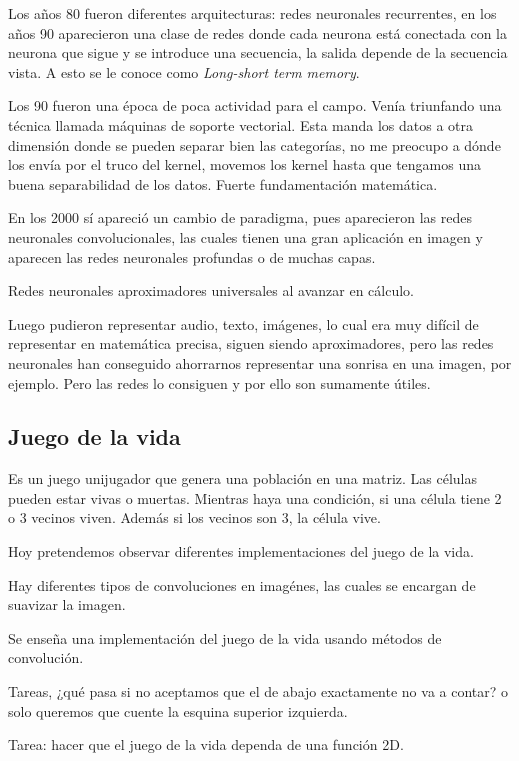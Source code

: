 \documentclass{article}
\theoremstyle{definition}
\begin{document}
Los años 80 fueron diferentes arquitecturas: redes neuronales 
recurrentes, en los años 90 aparecieron una clase de redes donde cada 
neurona está conectada con la neurona que sigue y se introduce una 
secuencia, la salida depende de la secuencia vista. A esto se le 
conoce como \textit{Long-short term memory}. 

Los 90 fueron una época de poca actividad para el campo. Venía 
triunfando una técnica llamada máquinas de soporte vectorial.
Esta manda los datos a otra dimensión donde se pueden separar bien 
las categorías, no me preocupo a dónde los envía por el truco del 
kernel, movemos los kernel hasta que tengamos una buena separabilidad
de los datos. Fuerte fundamentación matemática. 

En los 2000 sí apareció un cambio de paradigma, pues aparecieron las 
redes neuronales convolucionales, las cuales tienen una gran aplicación
en imagen y aparecen las redes neuronales profundas o de muchas capas.

Redes neuronales aproximadores universales al avanzar en cálculo. 

Luego pudieron representar audio, texto, imágenes, lo cual era muy 
difícil de representar en matemática precisa, siguen siendo aproximadores,
pero las redes neuronales han conseguido ahorrarnos representar una 
sonrisa en una imagen, por ejemplo. Pero las redes lo consiguen y 
por ello son sumamente útiles.

\subsection{Juego de la vida}

Es un juego unijugador que genera una población en una matriz.
Las células pueden estar vivas o muertas.
Mientras haya una condición, si una célula tiene 2 o 3 vecinos
viven. Además si los vecinos son 3, la célula vive.

Hoy pretendemos observar diferentes implementaciones del juego 
de la vida.

Hay diferentes tipos de convoluciones en imagénes, las cuales 
se encargan de suavizar la imagen. 

Se enseña una implementación del juego de la vida usando métodos
de convolución.

Tareas, ¿qué pasa si no aceptamos que el de abajo exactamente no va 
a contar? o solo queremos que cuente la esquina superior izquierda.

Tarea: hacer que el juego de la vida dependa de una función 2D.
\end{document}
